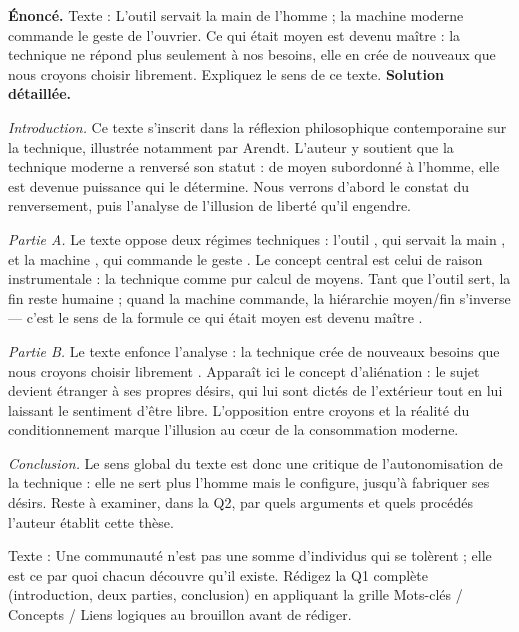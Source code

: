 \documentclass[11pt]{article}
\newcommand{\cle}[1]{{\popxbold\color{popdark}#1}}
\begin{document}
\begin{exoresolu}
\textbf{Énoncé.} Texte : \og L'outil servait la main de l'homme ; la machine moderne commande le geste de l'ouvrier. Ce qui était moyen est devenu maître : la technique ne répond plus seulement à nos besoins, elle en crée de nouveaux que nous croyons choisir librement. \fg Expliquez le sens de ce texte.
\tcblower
\textbf{Solution détaillée.}

\emph{Introduction.} Ce texte s'inscrit dans la réflexion philosophique contemporaine sur la technique, illustrée notamment par Arendt. L'auteur y soutient que la technique moderne a renversé son statut : de moyen subordonné à l'homme, elle est devenue puissance qui le détermine. Nous verrons d'abord le constat du renversement, puis l'analyse de l'illusion de liberté qu'il engendre.

\emph{Partie A.} Le texte oppose deux régimes techniques : l'\og outil \fg, qui \og servait la main \fg, et la \og machine \fg, qui \og commande le geste \fg. Le concept central est celui de \cle{raison instrumentale} : la technique comme pur calcul de moyens. Tant que l'outil sert, la fin reste humaine ; quand la machine commande, la hiérarchie moyen/fin s'inverse — c'est le sens de la formule \og ce qui était moyen est devenu maître \fg.

\emph{Partie B.} Le texte enfonce l'analyse : la technique \og crée de nouveaux besoins que nous croyons choisir librement \fg. Apparaît ici le concept d'\cle{aliénation} : le sujet devient étranger à ses propres désirs, qui lui sont dictés de l'extérieur tout en lui laissant le sentiment d'être libre. L'opposition entre \og croyons \fg et la réalité du conditionnement marque l'illusion au cœur de la consommation moderne.

\emph{Conclusion.} Le sens global du texte est donc une critique de l'autonomisation de la technique : elle ne sert plus l'homme mais le configure, jusqu'à fabriquer ses désirs. Reste à examiner, dans la Q2, par quels arguments et quels procédés l'auteur établit cette thèse.
\end{exoresolu}

\begin{exercice}
Texte : \og Une communauté n'est pas une somme d'individus qui se tolèrent ; elle est ce par quoi chacun découvre qu'il existe. \fg Rédigez la Q1 complète (introduction, deux parties, conclusion) en appliquant la grille \og Mots-clés / Concepts / Liens logiques \fg au brouillon avant de rédiger.
\end{exercice}
\end{document}
